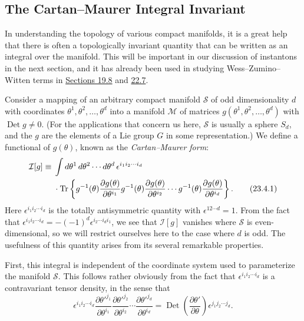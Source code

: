 \subsection{The Cartan--Maurer Integral Invariant}
\label{sec:23.4}

In understanding the topology of various compact manifolds, it is a great
help that there is often a topologically invariant quantity that can be
written as an integral over the manifold. This will be important in our
discussion of instantons in the next section, and it has already been used
in studying Wess--Zumino--Witten terms in
\hyperref[sec:19.8]{Sections 19.8} and \hyperref[sec:22.7]{22.7}.

Consider a mapping of an arbitrary compact manifold $\mathcal S$ of odd
dimensionality $d$ with coordinates
$\theta^1,\theta^2,\ldots,\theta^d$ into a manifold $\mathcal M$ of
matrices $g(\theta^1,\theta^2,\ldots,\theta^d)$ with
$\operatorname{Det}g\ne0$. (For the applications that concern us here,
$\mathcal S$ is usually a sphere $S_d$, and the $g$ are the elements of a
Lie group $G$ in some representation.) We define a functional of
$g(\theta)$, known as the \emph{Cartan--Maurer form}:
\begin{align}
\mathcal I[g]\equiv{}&
\int d\theta^1\,d\theta^2\cdots d\theta^d\,
\epsilon^{i_1i_2\cdots i_d}
\notag\\
&{}\cdot\operatorname{Tr}\left\{
g^{-1}(\theta)\frac{\partial g(\theta)}{\partial\theta^{i_1}}
g^{-1}(\theta)\frac{\partial g(\theta)}{\partial\theta^{i_2}}
\cdots
g^{-1}(\theta)\frac{\partial g(\theta)}{\partial\theta^{i_d}}
\right\}.
\tag{23.4.1}\label{eq:23.4.1}
\end{align}
Here $\epsilon^{i_1i_2\cdots i_d}$ is the totally antisymmetric quantity
with $\epsilon^{12\cdots d}=1$. From the fact that
$\epsilon^{i_1i_2\cdots i_d}=-(-1)^d
\epsilon^{i_2\cdots i_di_1}$, we see that $\mathcal I[g]$ vanishes where
$\mathcal S$ is even-dimensional, so we will restrict ourselves here to
the case where $d$ is odd. The usefulness of this quantity arises from
its several remarkable properties.

First, this integral is independent of the coordinate system used to
parameterize the manifold $\mathcal S$. This follows rather obviously
from the fact that $\epsilon^{i_1i_2\cdots i_d}$ is a contravariant tensor
density, in the sense that
\[
\epsilon^{i_1i_2\cdots i_d}
\frac{\partial\theta'^{j_1}}{\partial\theta^{i_1}}
\frac{\partial\theta'^{j_2}}{\partial\theta^{i_2}}\cdots
\frac{\partial\theta'^{j_d}}{\partial\theta^{i_d}}
=\operatorname{Det}\left(\frac{\partial\theta'}{\partial\theta}\right)
\epsilon^{j_1j_2\cdots j_d}.
\]

